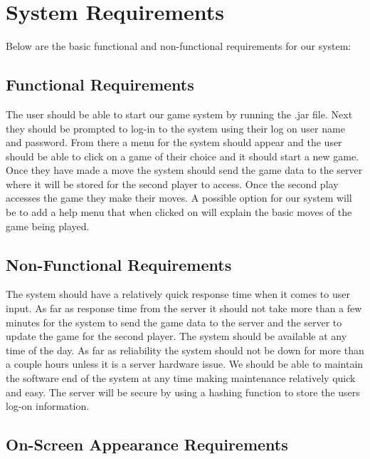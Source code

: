 \documentclass[11pt,a4paper]{article}
\begin{document}
\section{System Requirements}
Below are the basic functional and non-functional requirements for our system:



\subsection{Functional Requirements}

The user should be able to start our game system by running the .jar file. Next they should be prompted to log-in to the system using their log on user name and password. From there a menu for the system should appear and the user should be able to click on a game of their choice and it should start a new game. Once they have made a move the system should send the game data to the server where it will be stored for the second player to access. Once the second play accesses the game they make their moves. A possible option for our system will be to add a help menu that when clicked on will explain the basic moves of the game being played.


\subsection{Non-Functional Requirements}

The system should have a relatively quick response time when it comes to user input. As far as response time from the server it should not take more than a few minutes for the system to send the game data to the server and the server to update the game for the second player. The system should be available at any time of the day. As far as reliability the system should not be down for more than a couple hours unless it is a server hardware issue. We should be able to maintain the software end of the system at any time making maintenance relatively quick and easy. The server will be secure by using a hashing function to store the users log-on information. 

\subsection{On-Screen Appearance Requirements}
\end{document}
